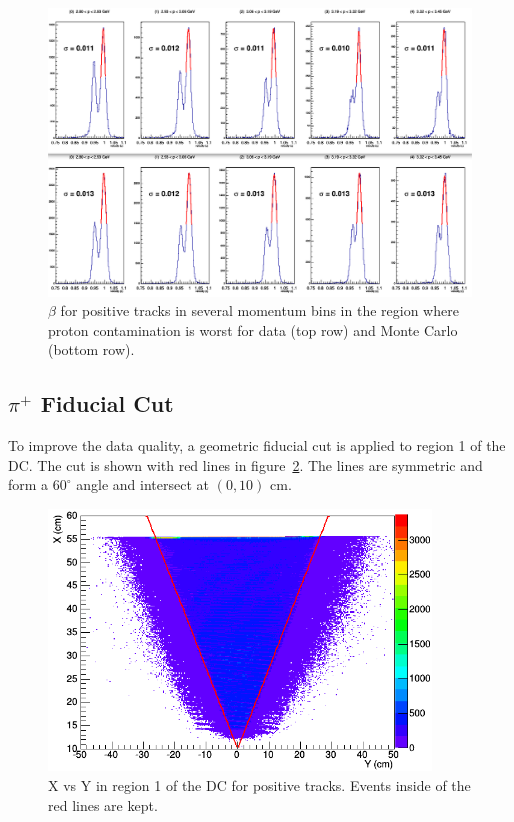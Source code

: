 %
\begin{figure}[htp]
\centering
\includegraphics[width=6in]{figures/pipID_beta_pBins_dataTop_MCbottom.png}
\caption{$\beta$ for positive tracks in several momentum bins in the region where proton contamination is worst for data (top row) and Monte Carlo (bottom row).}
\label{fig:pipID_beta_pBins_dataTop_MCbottom}
\end{figure}
%
\subsection{$\pi^+$ Fiducial Cut}
To improve the data quality, a geometric fiducial cut is applied to region 1 of the DC.
The cut is shown with red lines in figure~\ref{fig:pip_R1cut_s4}.
The lines are symmetric and form a $60^\circ$ angle and intersect at $(0, 10)$ cm.
\begin{figure}[htp]
\centering
\includegraphics[width=4in]{figures/pip_R1cut_s4.png}
\caption{X vs Y in region 1 of the DC for positive tracks. Events inside of the red lines are kept.}
\label{fig:pip_R1cut_s4}
\end{figure}
%
%

